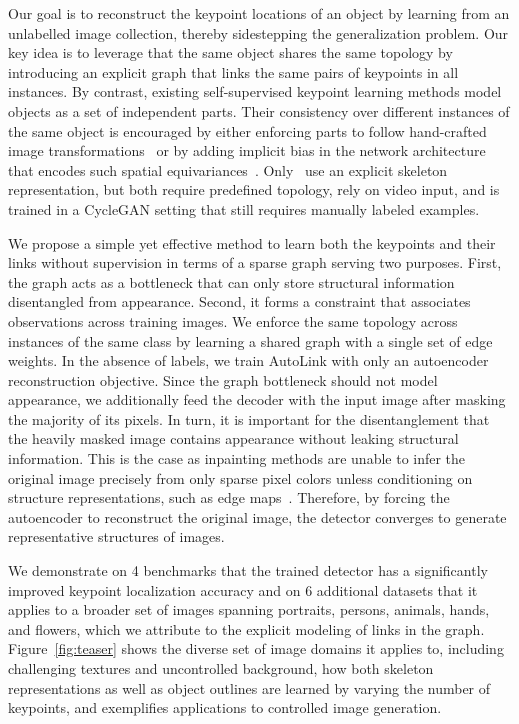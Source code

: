 \documentclass{article}
\begin{document}
Our goal is to reconstruct the keypoint locations of an object by learning from an unlabelled image collection, thereby sidestepping the generalization problem.
Our key idea is to leverage that the same object shares the same topology by introducing an explicit graph that links the same pairs of keypoints in all instances.
By contrast, existing self-supervised keypoint learning methods model objects as a set of independent parts.
Their consistency over different instances of the same object is encouraged by either enforcing parts to follow hand-crafted image transformations~\cite{thewlis2017unsupervised, zhang2018unsupervised, jakab2018unsupervised, lorenz2019unsupervised, hung2019scops, liu2021unsupervised} or by adding implicit bias in the network architecture that encodes such spatial equivariances~\cite{he2022ganseg, he2021latentkeypointgan}.
Only~\cite{jakab2020self, schmidtke2021unsupervised} use an explicit skeleton representation, but both require predefined topology, rely on video input, and \cite{jakab2020self} is trained in a CycleGAN setting that still requires manually labeled examples.


We propose a simple yet effective method to learn both the keypoints and their links without supervision in terms of a sparse graph serving two purposes. 
First, the graph acts as a bottleneck that can only store structural information disentangled from appearance. 
Second, it forms a constraint that associates observations across training images. We enforce the same topology across instances of the same class by learning a shared graph with a single set of edge weights.
In the absence of labels, we train AutoLink with only an autoencoder reconstruction objective. Since the graph bottleneck should not model appearance, we additionally feed the decoder with the input image after masking the majority of its pixels.
In turn, it is important for the disentanglement that the heavily masked image contains appearance without leaking structural information. This is the case as inpainting methods are unable to infer the original image precisely from only sparse pixel colors \cite{zheng2019pluralistic, yu2021diverse}
unless conditioning on structure representations, such as edge maps~\cite{xiong2019foreground, nazeri2019edgeconnect, li2019progressive, lahiri2020prior, han2019finet}. 
Therefore, by forcing the autoencoder to reconstruct the original image, the detector converges to generate representative structures of images.


We demonstrate on 4 benchmarks that the trained detector has a significantly improved keypoint localization accuracy and on 6 additional datasets that it applies to a broader set of images spanning portraits, persons, animals, hands, and flowers, which we attribute to the explicit modeling of links in the graph. 
Figure~\ref{fig:teaser} shows the diverse set of image domains it applies to, including challenging textures and uncontrolled background, 
how both skeleton representations as well as object outlines are learned by varying the number of keypoints,
and exemplifies applications to controlled image generation. 
\end{document}
